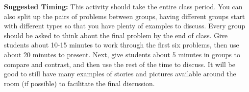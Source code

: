 \documentclass[nooutcomes,noauthor,handout]{ximera}
\begin{document}
\begin{instructorNotes}
{\bf Suggested Timing:} This activity should take the entire class period. You can also split up the pairs of problems between groups, having different groups start with different types so that you have plenty of examples to discuss. Every group should be asked to think about the final problem by the end of class. Give students about 10-15 minutes to work through the first six problems, then use about 20 minutes to present. Next, give students about 5 minutes in groups to compare and contrast, and then use the rest of the time to discuss. It will be good to still have many examples of stories and pictures available around the room (if possible) to facilitate the final discussion.

\end{instructorNotes}
\end{document}
